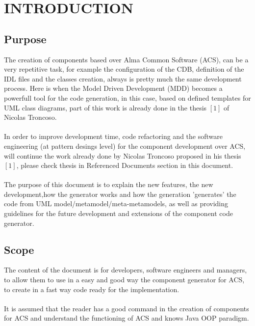 \section{INTRODUCTION} \label{sec:intro}

\subsection{Purpose}
The creation of components based over Alma Common Software (ACS), can be a very
repetitive task, for example the configuration of the CDB, definition of the IDL
files and the classes creation, always is pretty much the same development
process. Here is when the Model Driven Development (MDD) becomes a powerfull
tool for the code generation, in this case, based on defined templates for UML
class diagrams, part of this work is already done in the thesis $[1]$ of Nicolas
Troncoso.\\
\\
In order to improve development time, code refactoring and the software
engineering (at pattern desings level) for the component development over ACS,
will continue the work already done by Nicolas Troncoso proposed in his
thesis $[1]$, please check thesis in Referenced Documents section in this
document.\\
\\
The purpose of this document is to explain the new features, the new
development,how the generator works and how the generation 'generates' the code
from UML model/metamodel/meta-metamodels, as well as providing guidelines for
the future development and extensions of the component code generator.

\subsection{Scope}
The content of the document is for developers, software engineers and managers,
to allow them to use in a easy and good way the component generator for ACS,
to create in a fast way code ready for the implementation.\\
\\
It is assumed that the reader has a good command in the creation of components
for ACS and understand the functioning of ACS and knows Java OOP paradigm. 

